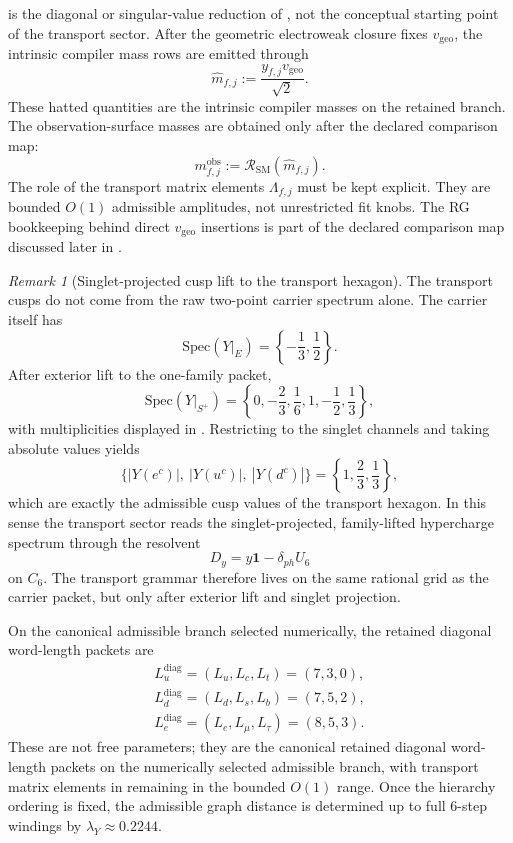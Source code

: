 \documentclass[11pt,a4paper]{article}
\theoremstyle{definition}
\theoremstyle{remark}
\newtheorem*{remark}{Remark}
\newcommand{\SM}{\mathrm{SM}}
\newcommand{\lambdaY}{\lambda_Y}
\newcommand{\vgeo}{v_{\mathrm{geo}}}
\begin{document}
 is the diagonal or singular-value reduction of , not the conceptual starting point of the transport sector.
After the geometric electroweak closure fixes $\vgeo$, the intrinsic compiler mass rows are emitted through
\begin{equation}
\label{eq:mass-bridge}
\hat m_{f,j}:=\frac{y_{f,j}\vgeo}{\sqrt2}.
\end{equation}
These hatted quantities are the intrinsic compiler masses on the retained branch. The observation-surface masses are obtained only after the declared comparison map:
\[
m_{f,j}^{\mathrm{obs}}:=\mathcal R_{\SM}(\hat m_{f,j}).
\]
The role of the transport matrix elements $\Lambda_{f,j}$ must be kept explicit. They are bounded $O(1)$ admissible amplitudes, not unrestricted fit knobs. The RG bookkeeping behind direct $\vgeo$ insertions is part of the declared comparison map discussed later in .

\begin{remark}[Singlet-projected cusp lift to the transport hexagon]
The transport cusps do not come from the raw two-point carrier spectrum alone. The carrier itself has
\[
\mathrm{Spec}(Y|_E)=\left\{-\frac13,\frac12\right\}.
\]
After exterior lift to the one-family packet,
\[
\mathrm{Spec}(Y|_{S^+})
=
\left\{0,-\frac23,\frac16,1,-\frac12,\frac13\right\},
\]
with multiplicities displayed in . Restricting to the singlet channels and taking absolute values yields
\[
\{|Y(e^c)|,\ |Y(u^c)|,\ |Y(d^c)|\}
=
\left\{1,\frac23,\frac13\right\},
\]
which are exactly the admissible cusp values of the transport hexagon. In this sense the transport sector reads the singlet-projected, family-lifted hypercharge spectrum through the resolvent
\[
D_y=y\mathbf 1-\delta_{ph}U_6
\]
on $C_6$. The transport grammar therefore lives on the same rational grid as the carrier packet, but only after exterior lift and singlet projection.
\end{remark}

On the canonical admissible branch selected numerically, the retained diagonal word-length packets are
\begin{equation}
\label{eq:minimal-word-lengths}
\begin{gathered}
L_u^{\mathrm{diag}}=(L_u,L_c,L_t)=(7,3,0),\\
L_d^{\mathrm{diag}}=(L_d,L_s,L_b)=(7,5,2),\\
L_e^{\mathrm{diag}}=(L_e,L_\mu,L_\tau)=(8,5,3).
\end{gathered}
\end{equation}
These are not free parameters; they are the canonical retained diagonal word-length packets on the numerically selected admissible branch, with transport matrix elements in  remaining in the bounded $O(1)$ range. Once the hierarchy ordering is fixed, the admissible graph distance is determined up to full $6$-step windings by $\lambdaY\approx\num{0.2244}$.
\end{document}
